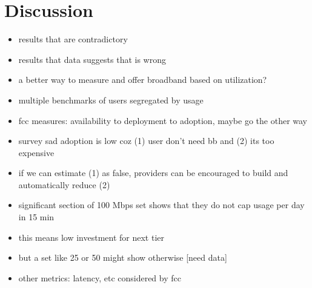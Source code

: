 \section{Discussion}
\label{sec:discussion}

\begin{itemize}
\itemsep0em
\item results that are contradictory
\item results that data suggests that is wrong
\item a better way to measure and offer broadband based on utilization?
\item multiple benchmarks of users segregated by usage
\item fcc measures: availability to deployment to adoption, maybe go the other way
\item survey sad adoption is low coz (1) user don't need bb and (2) its too expensive
\item if we can estimate (1) as false, providers can be encouraged to build and automatically
reduce (2)
\item significant section of 100 Mbps set shows that they do not cap usage per day in 15 min
\item this means low investment for next tier
\item but a set like 25 or 50 might show otherwise [need data]
\item other metrics: latency, etc considered by fcc
\end{itemize}